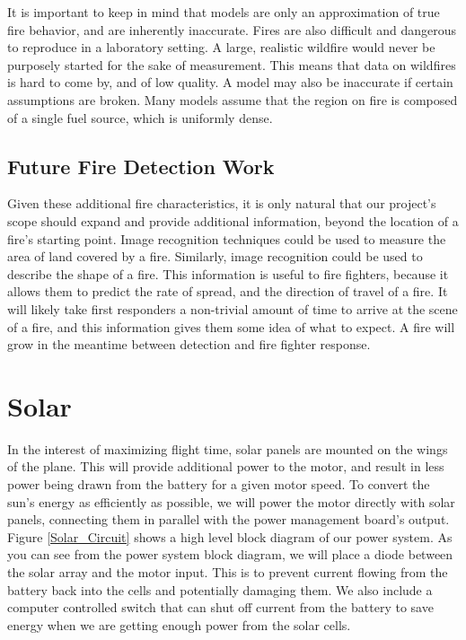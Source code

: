 \documentclass[12pt,journal,compsoc]{IEEEtran}
\begin{document}
It is important to keep in mind that models are only an approximation of true fire behavior, and are inherently inaccurate. Fires are also difficult and dangerous to reproduce in a laboratory setting. A large, realistic wildfire would never be purposely started for the sake of measurement. This means that data on wildfires is hard to come by, and of low quality. A model may also be inaccurate if certain assumptions are broken. Many models assume that the region on fire is composed of a single fuel source, which is uniformly dense.

\subsection{Future Fire Detection Work}
Given these additional fire characteristics, it is only natural that our project's scope should expand and provide additional information, beyond the location of a fire's starting point. Image recognition techniques could be used to measure the area of land covered by a fire. Similarly, image recognition could be used to describe the shape of a fire. This information is useful to fire fighters, because it allows them to predict the rate of spread, and the direction of travel of a fire. It will likely take first responders a non-trivial amount of time to arrive at the scene of a fire, and this information gives them some idea of what to expect. A fire will grow in the meantime between detection and fire fighter response. 

\section{Solar}
In the interest of maximizing flight time, solar panels are mounted on the wings of the plane. This will provide additional power to the motor, and result in less power being drawn from the battery for a given motor speed. To convert the sun's energy as efficiently as possible, we will power the motor directly with solar panels, connecting them in parallel with the power management board's output. Figure \ref{Solar_Circuit} shows a high level block diagram of our power system. As you can see from the power system block diagram, we will place a diode between the solar array and the motor input. This is to prevent current flowing from the battery back into the cells and potentially damaging them. We also include a computer controlled switch that can shut off current from the battery to save energy when we are getting enough power from the solar cells.
\end{document}
